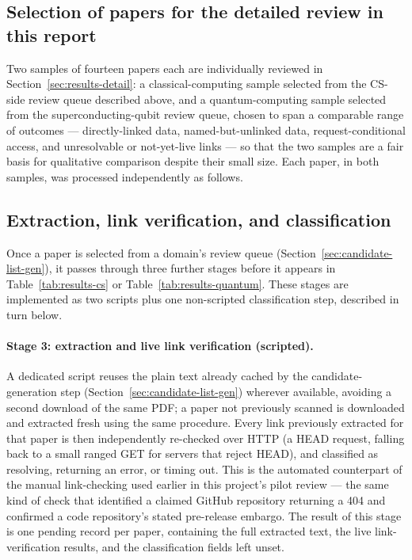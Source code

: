 \documentclass[11pt]{article}
\begin{document}
\subsection{Selection of papers for the detailed review in this report}
Two samples of fourteen papers each are individually reviewed in
Section~\ref{sec:results-detail}: a classical-computing sample selected from the CS-side
review queue described above, and a quantum-computing sample selected from the
superconducting-qubit review queue, chosen to span a comparable range of outcomes ---
directly-linked data, named-but-unlinked data, request-conditional access, and
unresolvable or not-yet-live links --- so that the two samples are a fair basis for
qualitative comparison despite their small size. Each paper, in both samples, was
processed independently as follows.

\subsection{Extraction, link verification, and classification}
\label{sec:extraction-classification}

Once a paper is selected from a domain's review queue (Section~\ref{sec:candidate-list-gen}),
it passes through three further stages before it appears in Table~\ref{tab:results-cs}
or Table~\ref{tab:results-quantum}. These stages are implemented as two scripts plus one
non-scripted classification step, described in turn below.

\paragraph{Stage 3: extraction and live link verification (scripted).} A dedicated
script reuses the plain text already cached by the candidate-generation step
(Section~\ref{sec:candidate-list-gen}) wherever available, avoiding a second download
of the same PDF; a paper not previously scanned is downloaded and extracted fresh using
the same procedure. Every link previously extracted for that paper is then
independently re-checked over HTTP (a HEAD request, falling back to a small ranged GET
for servers that reject HEAD), and classified as resolving, returning an error, or
timing out. This is the automated counterpart of the manual link-checking used earlier
in this project's pilot review --- the same kind of check that identified a claimed
GitHub repository returning a 404 and confirmed a code repository's stated pre-release
embargo. The result of this stage is one pending record per paper, containing the full
extracted text, the live link-verification results, and the classification fields left
unset.
\end{document}
